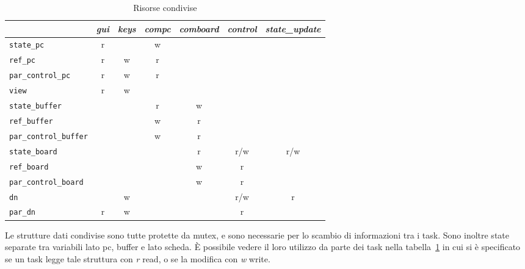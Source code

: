 
\begin{table}[]
	\centering
	\begin{tabular}{l|c|c|c|c|c|c}
		& \textit{gui} & \textit{keys} & \textit{compc} & \textit{comboard} & \textit{control} & \textit{state\_update} \\ \hline
		\texttt{state\_pc}		              & r   &      & w     &          &         &               \\ \hline
		\texttt{ref\_pc}             		  & r   & w    & r     &          &         &               \\ \hline
		\texttt{par\_control\_pc}              & r   & w    & r     &          &         &               \\ \hline
		\texttt{view }                         & r   & w    &       &          &         &               \\ \hline
		\texttt{state\_buffer}                 &     &      & r     & w        &         &               \\ \hline
		\texttt{ref\_buffer}                   &     &      & w     & r        &         &               \\ \hline 
		\texttt{par\_control\_buffer}		  &     &      & w     & r        &         &               \\ \hline
		\texttt{state\_board}                  &     &      &       & r        & r/w     & r/w           \\ \hline
		\texttt{ref\_board}                    &     &      &       & w        & r       &               \\ \hline
		\texttt{par\_control\_board}           &     &      &       & w        & r       &               \\ \hline
		\texttt{dn}                            &     & w     &       &          & r/w     & r             \\ \hline
		\texttt{par\_dn}                       & r   & w    &       &          & r       &               \\ \hline
	\end{tabular}
	\caption{Risorse condivise}
	\label{tab:risorse_task}
\end{table}

Le strutture dati condivise sono tutte protette da mutex, e sono necessarie per lo scambio di informazioni tra i task. Sono inoltre state separate tra variabili lato pc, buffer e lato scheda. \`E possibile vedere il loro utilizzo da parte dei task nella tabella~\ref{tab:risorse_task} in cui si \`e specificato se un task legge tale struttura con \textit{r} read, o se la modifica con \textit{w} write.

